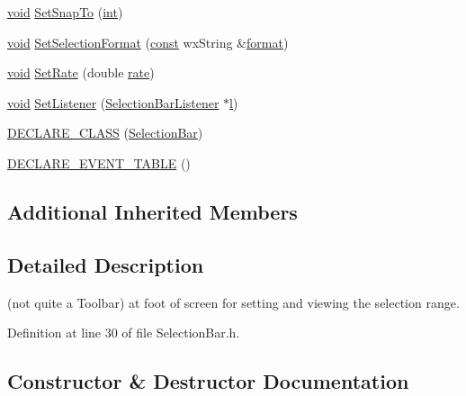 \begin{DoxyCompactItemize}
\hyperlink{sound_8c_ae35f5844602719cf66324f4de2a658b3}{void} \hyperlink{class_selection_bar_a98e11d6d9ce85c9d8d59157554fc78e0}{Set\+Snap\+To} (\hyperlink{xmltok_8h_a5a0d4a5641ce434f1d23533f2b2e6653}{int})
\item 
\hyperlink{sound_8c_ae35f5844602719cf66324f4de2a658b3}{void} \hyperlink{class_selection_bar_a6b150beecb302a559aeae58f6fdfd108}{Set\+Selection\+Format} (\hyperlink{getopt1_8c_a2c212835823e3c54a8ab6d95c652660e}{const} wx\+String \&\hyperlink{_export_p_c_m_8cpp_a317afff57d87a89158c2b038d37b2b08}{format})
\item 
\hyperlink{sound_8c_ae35f5844602719cf66324f4de2a658b3}{void} \hyperlink{class_selection_bar_a2a2753f6c6cc2ec77f57a1365bdae649}{Set\+Rate} (double \hyperlink{seqread_8c_ad89d3fac2deab7a9cf6cfc8d15341b85}{rate})
\item 
\hyperlink{sound_8c_ae35f5844602719cf66324f4de2a658b3}{void} \hyperlink{class_selection_bar_a6d163f92d21632011c4408fe8dc5d8f2}{Set\+Listener} (\hyperlink{class_selection_bar_listener}{Selection\+Bar\+Listener} $\ast$\hyperlink{layer3_8c_a741dbb4d8e78c3cb69915db7282fcec0}{l})
\item 
\hyperlink{class_selection_bar_a105bfa8382ec0f11c538e84fbc9bb09a}{D\+E\+C\+L\+A\+R\+E\+\_\+\+C\+L\+A\+SS} (\hyperlink{class_selection_bar}{Selection\+Bar})
\item 
\hyperlink{class_selection_bar_ae859ccf4feeeb8217b9d71eb8898bae2}{D\+E\+C\+L\+A\+R\+E\+\_\+\+E\+V\+E\+N\+T\+\_\+\+T\+A\+B\+LE} ()
\end{DoxyCompactItemize}
\subsection*{Additional Inherited Members}


\subsection{Detailed Description}
(not quite a Toolbar) at foot of screen for setting and viewing the selection range. 

Definition at line 30 of file Selection\+Bar.\+h.



\subsection{Constructor \& Destructor Documentation}
